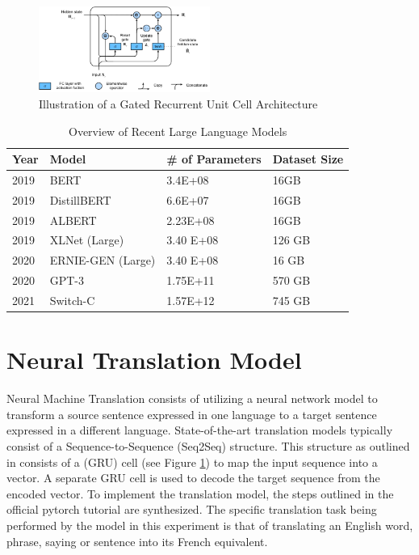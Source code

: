 \documentclass{sigchi}
\begin{document}
\begin{figure}[t]
\centering
\includegraphics[width=0.5\textwidth]{figures/gru.png}
\caption{Illustration of a Gated Recurrent Unit Cell Architecture \cite{gru} }
\label{fig:grucell}
\end{figure}

\begin{table}[t]
\centering
    \begin{tabular}{ l{1.5cm} l{2.5cm} l{2.5cm} l{1cm} }
     \hline
     Year & Model & \# of Parameters & Dataset Size\\
     \hline
     2019   &   BERT    &   3.4E+08 &   16GB \\
     2019   &   DistillBERT &   6.6E+07 &   16GB \\
     2019 & ALBERT & 2.23E+08 & 16GB \\
     2019 & XLNet (Large) & 3.40 E+08 & 126 GB \\ 
     2020 & ERNIE-GEN (Large) & 3.40 E+08 & 16 GB \\
     2020 & GPT-3 & 1.75E+11 & 570 GB \\
     2021 & Switch-C & 1.57E+12 & 745 GB \\
     \hline
    \end{tabular}
\caption{Overview of Recent Large Language Models \cite{stochasticparrots}}
\label{tab:modeltable}
\end{table}

\section{Neural Translation Model}
Neural Machine Translation consists of utilizing a neural network model to transform a source sentence expressed in one language to a target sentence expressed in a different language. State-of-the-art translation models typically consist of a Sequence-to-Sequence (Seq2Seq) structure. This structure as outlined in \cite{seqtoseq} consists of a (GRU)  cell (see Figure \ref{fig:grucell}) to map the input sequence into a vector. A separate GRU cell is used to decode the target sequence from the encoded vector. To implement the translation model, the steps outlined in the official pytorch tutorial are synthesized. \cite{seq2seqtorch} The specific translation task being performed by the model in this experiment is that of translating an English word, phrase, saying or sentence into its French equivalent.
\end{document}

